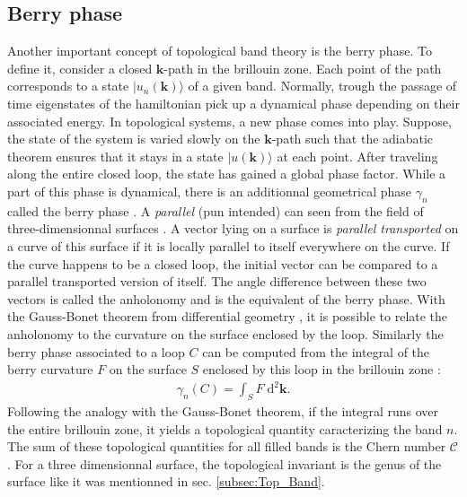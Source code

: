 \subsection{Berry phase}
Another important concept of topological band theory is the berry phase. To define it, consider a closed $\mathbf{k}$-path in the brillouin zone. Each point of the path corresponds to a state $|u_n(\mathbf{k})\rangle$ \cite{bernevig_topological_2013} of a given band. Normally, trough the passage of time eigenstates of the hamiltonian pick up a dynamical phase depending on their associated energy. In topological systems, a new phase comes into play. Suppose, the state of the system is varied slowly on the $\mathbf{k}$-path such that the adiabatic theorem ensures that it stays in a state $|u(\mathbf{k})\rangle$ at each point. After traveling along the entire closed loop, the state has gained a global phase factor. While a part of this phase is dynamical, there is an additionnal geometrical phase $\gamma_n$ called the berry phase \cite{bernevig_topological_2013}. A \textit{parallel} (pun intended) can seen from the field of three-dimensionnal surfaces \cite{chang_x_nodate}. A vector lying on a surface is \textit{parallel transported} on  a curve of this surface if it is locally parallel to itself everywhere on the curve. If the curve happens to be a closed loop, the initial vector can be compared to a parallel transported version of itself. The angle difference between these two vectors is called the anholonomy \cite{chang_x_nodate} and is the equivalent of the berry phase. With the Gauss-Bonet theorem from differential geometry \cite{chang_x_nodate}, it is possible to relate the anholonomy to the curvature on the surface enclosed by the loop. Similarly the berry phase associated to a loop $C$ can be computed from the integral of the berry curvature $F$ on the surface $S$ enclosed by this loop in the brillouin zone \cite{kane_topological_2013}:
\begin{align}
   \gamma_n(C) =  \int_S F \; \text{d}^2\mathbf{k}. \tag{$\star$} \label{berry}
\end{align}
Following the analogy with the Gauss-Bonet theorem, if the integral runs over the entire brillouin zone, it yields a topological quantity caracterizing the band $n$. The sum of these topological quantities for all filled bands is the Chern number $\mathcal{C}$ \cite{bernevig_topological_2013}. For a three dimensionnal surface, the topological invariant is the genus of the surface like it was mentionned in sec. \ref{subsec:Top_Band}.\\

